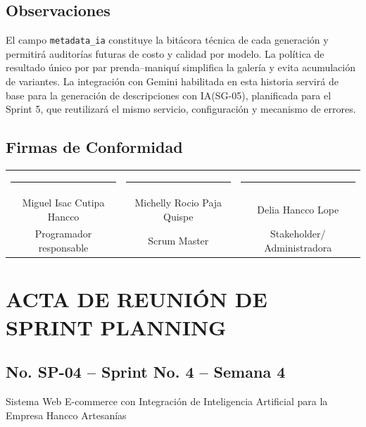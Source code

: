 \documentclass[12pt,a4paper]{article}
\renewcommand{\arraystretch}{1.25}
\begin{document}
\subsection*{Observaciones}

El campo \texttt{metadata\_ia} constituye la bitácora técnica de cada generación y permitirá auditorías futuras de costo y calidad por modelo. La política de resultado único por par prenda--maniquí simplifica la galería y evita acumulación de variantes. La integración con Gemini habilitada en esta historia servirá de base para la generación de descripciones con IA(SG-05), planificada para el Sprint 5, que reutilizará el mismo servicio, configuración y mecanismo de errores.

\subsection*{Firmas de Conformidad}

\begin{center}
\renewcommand{\arraystretch}{2}
\begin{tabular}{ccc}
\rule{4.5cm}{0.4pt} & \rule{4.5cm}{0.4pt} & \rule{4.5cm}{0.4pt} \\
Miguel Isac Cutipa Hancco & Michelly Rocio Paja Quispe & Delia Hancco Lope \\
Programador responsable & Scrum Master & Stakeholder/ Administradora
\end{tabular}
\end{center}

\clearpage

\section*{ACTA DE REUNIÓN DE SPRINT PLANNING}

\subsection*{No. SP-04 -- Sprint No. 4 -- Semana 4}

\begin{center}
Sistema Web E-commerce con Integración de Inteligencia Artificial para la Empresa Hancco Artesanías
\end{center}
\end{document}

